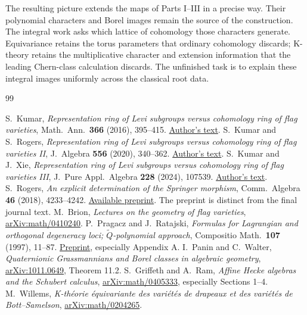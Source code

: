 \documentclass[11pt,letterpaper]{article}
\theoremstyle{definition}\newtheorem{definition}[theorem]{Definition}
\begin{document}
The resulting picture extends the maps of Parts I--III in a precise
way. Their polynomial characters and Borel images remain the source
of the construction. The integral work asks which lattice of
cohomology those characters generate. Equivariance retains the torus
parameters that ordinary cohomology discards; K-theory retains the
multiplicative character and extension information that the leading
Chern-class calculation discards. The unfinished task is to explain
these integral images uniformly across the classical root data.

\begin{thebibliography}{99}
\small\raggedright\setlength{\itemsep}{2pt}
S.~Kumar, \emph{Representation ring of Levi subgroups versus cohomology
ring of flag varieties}, Math.\ Ann.\ \textbf{366} (2016), 395--415.
\href{https://kumar.math.unc.edu/papers/kumar76.pdf}{Author's text}.
S.~Kumar and S.~Rogers, \emph{Representation ring of Levi subgroups versus
cohomology ring of flag varieties II}, J.\ Algebra \textbf{556} (2020),
340--362. \href{https://kumar.math.unc.edu/papers/kumar81.pdf}{Author's text}.
S.~Kumar and J.~Xie, \emph{Representation ring of Levi subgroups versus
cohomology ring of flag varieties III}, J.\ Pure Appl.\ Algebra
\textbf{228} (2024), 107539.
\href{https://kumar.math.unc.edu/papers/kumar86.pdf}{Author's text}.
S.~Rogers, \emph{An explicit determination of the Springer morphism},
Comm.\ Algebra \textbf{46} (2018), 4233--4242.
\href{https://arxiv.org/abs/1701.01538}{Available preprint}.
The preprint is distinct from the final journal text.
M.~Brion, \emph{Lectures on the geometry of flag varieties},
\href{https://arxiv.org/abs/math/0410240}{arXiv:math/0410240}.
P.~Pragacz and J.~Ratajski, \emph{Formulas for Lagrangian and orthogonal
degeneracy loci; \(\widetilde Q\)-polynomial approach},
Compositio Math.\ \textbf{107} (1997), 11--87.
\href{https://arxiv.org/abs/alg-geom/9602019}{Preprint}, especially Appendix A.
I.~Panin and C.~Walter, \emph{Quaternionic Grassmannians and Borel classes
in algebraic geometry},
\href{https://arxiv.org/abs/1011.0649}{arXiv:1011.0649}, Theorem 11.2.
S.~Griffeth and A.~Ram, \emph{Affine Hecke algebras and the Schubert
calculus}, \href{https://arxiv.org/abs/math/0405333}{arXiv:math/0405333},
especially Sections 1--4.
M.~Willems, \emph{K-th\'eorie \'equivariante des vari\'et\'es de drapeaux
et des vari\'et\'es de Bott--Samelson},
\href{https://arxiv.org/abs/math/0204265}{arXiv:math/0204265}.

\end{thebibliography}
\end{document}
